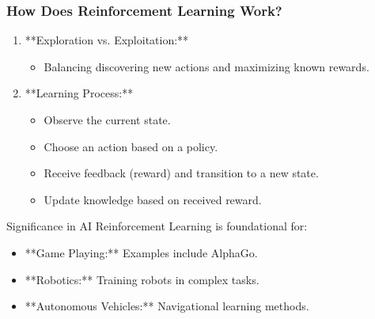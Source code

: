 \documentclass[aspectratio=169]{beamer}
\begin{document}
\begin{frame}[fragile]
    \frametitle{How Does Reinforcement Learning Work?}

    \begin{enumerate}
        \item **Exploration vs. Exploitation:** 
            \begin{itemize}
                \item Balancing discovering new actions and maximizing known rewards.
            \end{itemize}
        \item **Learning Process:**
            \begin{itemize}
                \item Observe the current state.
                \item Choose an action based on a policy.
                \item Receive feedback (reward) and transition to a new state.
                \item Update knowledge based on received reward.
            \end{itemize}
    \end{enumerate}
    
    \begin{block}{Significance in AI}
        Reinforcement Learning is foundational for:
        \begin{itemize}
            \item **Game Playing:** Examples include AlphaGo.
            \item **Robotics:** Training robots in complex tasks.
            \item **Autonomous Vehicles:** Navigational learning methods.
        \end{itemize}
    \end{block}
\end{frame}
\end{document}
